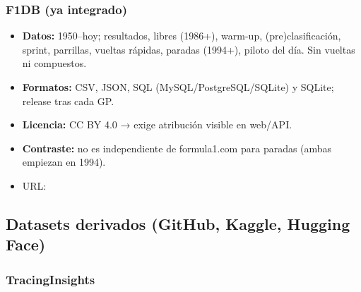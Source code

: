 \subsubsection{F1DB (ya integrado)}

\begin{itemize}
\item \textbf{Datos:} 1950–hoy; resultados, libres (1986+), warm-up, (pre)clasificación, sprint, parrillas, vueltas rápidas, paradas (1994+), piloto del día. Sin vueltas ni compuestos.
\item \textbf{Formatos:} CSV, JSON, SQL (MySQL/PostgreSQL/SQLite) y SQLite; release tras cada GP.
\item \textbf{Licencia:} CC BY 4.0 → exige atribución visible en web/API.
\item \textbf{Contraste:} no es independiente de formula1.com para paradas (ambas empiezan en 1994).
\item URL: \href{https://github.com/f1db/f1db}{}
\end{itemize}

\subsection{Datasets derivados (GitHub, Kaggle, Hugging Face)}

\subsubsection{TracingInsights}

